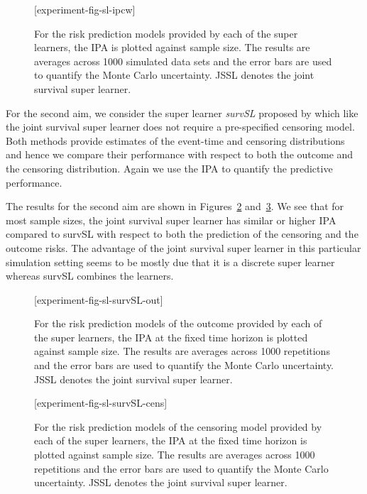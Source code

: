 \documentclass[lineno]{biometrika}
\newcommand{\1}{\mathds{1}}
\begin{document}
\begin{figure}
\figurebox{20pc}{25pc}{}[experiment-fig-sl-ipcw]
\caption{For the risk prediction models provided by each of the
    super learners, the IPA is plotted against sample size. The
    results are averages across 1000 simulated data sets and the error
    bars are used to quantify the Monte Carlo uncertainty. JSSL
    denotes the joint survival super learner. }
\label{fig:ipcw-fail}
\end{figure}

For the second aim, we consider the super learner {\it survSL}
proposed by \citep{westling2021inference} which like the joint
survival super learner does not require a pre-specified censoring
model. Both methods provide estimates of the event-time and censoring
distributions and hence we compare their performance with respect to
both the outcome and the censoring distribution. Again we use the IPA
to quantify the predictive performance.

The results for the second aim are shown in
Figures~\ref{fig:zelefski-out} and~\ref{fig:zelefski-cens}. We see
that for most sample sizes, the joint survival super learner has
similar or higher IPA compared to survSL with respect to both the
prediction of the censoring and the outcome risks. The advantage of
the joint survival super learner in this particular simulation setting
seems to be mostly due that it is a discrete super learner whereas
survSL combines the learners.

\begin{figure}
\figurebox{20pc}{25pc}{}[experiment-fig-sl-survSL-out]
\caption{For the risk prediction models of the outcome provided by
  each of the super learners, the IPA at the fixed time horizon is
  plotted against sample size. The results are averages across 1000
  repetitions and the error bars are used to quantify the Monte Carlo
  uncertainty. JSSL denotes the joint survival super learner.}
\label{fig:zelefski-out}
\end{figure}

\begin{figure}
\figurebox{20pc}{25pc}{}[experiment-fig-sl-survSL-cens]
\caption{For the risk prediction models of the censoring model
    provided by each of the super learners, the IPA at the fixed time
    horizon is plotted against sample size. The results are averages
    across 1000 repetitions and the error bars are used to quantify
    the Monte Carlo uncertainty. JSSL denotes the joint survival super
    learner.}
\label{fig:zelefski-cens}
\end{figure}
\end{document}
